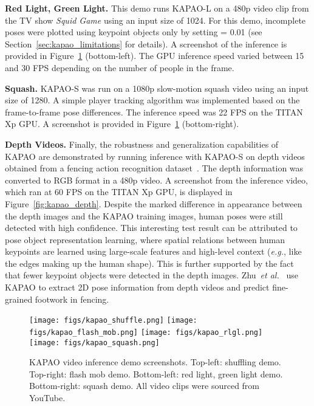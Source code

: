 \documentclass[runningheads]{llncs}
\newcommand{\etal}{\textit{et al.}}
\newcommand{\eg}{\textit{e.g.}}
\begin{document}
\medskip\noindent\textbf{Red Light, Green Light.} This demo runs KAPAO-L on a 480p video clip from the TV show \textit{Squid Game} using an input size of 1024. For this demo, incomplete poses were plotted using keypoint objects only by setting  = 0.01 (see Section~\ref{sec:kapao_limitations} for details). A screenshot of the inference is provided in Figure~\ref{fig:kapao_demos} (bottom-left). The GPU inference speed varied between 15 and 30 FPS depending on the number of people in the frame. 

\medskip\noindent\textbf{Squash.} KAPAO-S was run on a 1080p slow-motion squash video using an input size of 1280. A simple player tracking algorithm was implemented based on the frame-to-frame pose differences. The inference speed was 22 FPS on the TITAN Xp GPU. A screenshot is provided in Figure~\ref{fig:kapao_demos} (bottom-right).

\medskip\noindent\textbf{Depth Videos.} Finally, the robustness and generalization capabilities of KAPAO are demonstrated by running inference with KAPAO-S on depth videos obtained from a fencing action recognition dataset~\cite{app_malawski2016classification}. The depth information was converted to RGB format in a 480p video. A screenshot from the inference video, which ran at 60 FPS on the TITAN Xp GPU, is displayed in Figure~\ref{fig:kapao_depth}. Despite the marked difference in appearance between the depth images and the KAPAO training images, human poses were still detected with high confidence. This interesting test result can be attributed to pose object representation learning, where spatial relations between human keypoints are learned using large-scale features and high-level context (\eg, like the edges making up the human shape). This is further supported by the fact that fewer keypoint objects were detected in the depth images. Zhu~\etal~\cite{app_zhu2022fencenet} use KAPAO to extract 2D pose information from depth videos and predict fine-grained footwork in fencing. 

\begin{figure}
\centering
    \texttt{[image: figs/kapao\_shuffle.png]}
    \texttt{[image: figs/kapao\_flash\_mob.png]}
    \texttt{[image: figs/kapao\_rlgl.png]}
    \texttt{[image: figs/kapao\_squash.png]}
\caption[KAPAO video inference screenshots.]{KAPAO video inference demo screenshots. Top-left: shuffling demo. Top-right: flash mob demo. Bottom-left: red light, green light demo. Bottom-right: squash demo. All video clips were sourced from YouTube.}
\label{fig:kapao_demos}
\end{figure}
\end{document}
